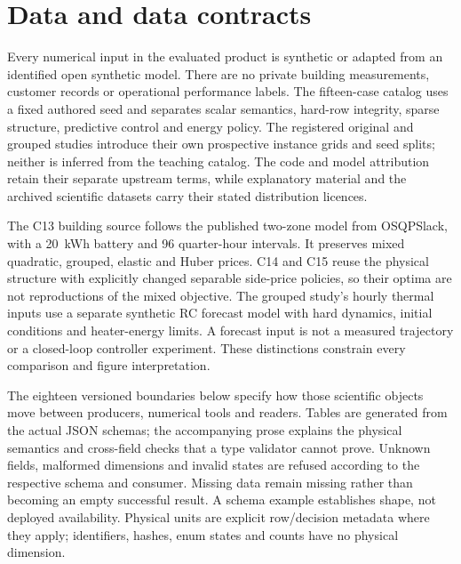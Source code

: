 \section{Data and data contracts}\label{sec:data}
Every numerical input in the evaluated product is synthetic or adapted from an
identified open synthetic model. There are no private building measurements,
customer records or operational performance labels. The fifteen-case catalog
uses a fixed authored seed and separates scalar semantics, hard-row integrity,
sparse structure, predictive control and energy policy. The registered original
and grouped studies introduce their own prospective instance grids and seed
splits; neither is inferred from the teaching catalog. The code and model
attribution retain their separate upstream terms, while explanatory material
and the archived scientific datasets carry their stated distribution licences.

The C13 building source follows the published two-zone model from OSQPSlack,
with a 20~kWh battery and 96 quarter-hour intervals. It preserves mixed quadratic,
grouped, elastic and Huber prices. C14 and C15 reuse the physical structure with
explicitly changed separable side-price policies, so their optima are not
reproductions of the mixed objective. The grouped study's hourly thermal inputs
use a separate synthetic RC forecast model with hard dynamics, initial conditions
and heater-energy limits. A forecast input is not a measured trajectory or a
closed-loop controller experiment. These distinctions constrain every comparison
and figure interpretation.

The eighteen versioned boundaries below specify how those scientific objects
move between producers, numerical tools and readers. Tables are generated from
the actual JSON schemas; the accompanying prose explains the physical semantics
and cross-field checks that a type validator cannot prove. Unknown fields,
malformed dimensions and invalid states are refused according to the respective
schema and consumer. Missing data remain missing rather than becoming an empty
successful result. A schema example establishes shape, not deployed availability.
Physical units are explicit row/decision metadata where they apply; identifiers,
hashes, enum states and counts have no physical dimension.

